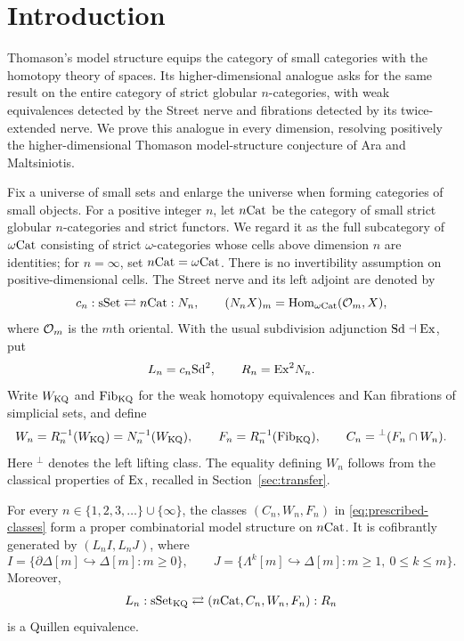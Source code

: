 \section{Introduction}
\label{sec:introduction}

Thomason's model structure equips the category of small categories with
the homotopy theory of spaces. Its higher-dimensional analogue asks for
the same result on the entire category of strict globular
$n$-categories, with weak equivalences detected by the Street nerve and
fibrations detected by its twice-extended nerve. We prove this analogue
in every dimension, resolving positively the higher-dimensional
Thomason model-structure conjecture of Ara and Maltsiniotis.

Fix a universe of small sets and enlarge the universe when forming
categories of small objects. For a positive integer $n$, let $n\mathrm{Cat}$ be
the category of small strict globular $n$-categories and strict functors.
We regard it as the full subcategory of $\omega\mathrm{Cat}$ consisting of strict
$\omega$-categories whose cells above dimension $n$ are identities; for
$n=\infty$, set $n\mathrm{Cat}=\omega\mathrm{Cat}$. There is no invertibility assumption on
positive-dimensional cells.
The Street nerve and its left adjoint are denoted by
\[
 c_n:\mathrm{sSet}\rightleftarrows n\mathrm{Cat}:N_n,
 \qquad (N_nX)_m=\operatorname{Hom}_{\omega\mathrm{Cat}}(\mathcal O_{m},X),
\]
where $\mathcal O_{m}$ is the $m$th oriental. With the usual subdivision
adjunction $\mathrm{Sd}\dashv\mathrm{Ex}$, put
\[
 L_n=c_n\mathrm{Sd}^2,\qquad R_n=\mathrm{Ex}^2N_n.
\]
Write $W_{\mathrm{KQ}}$ and $\mathrm{Fib}_{\mathrm{KQ}}$ for the weak homotopy
equivalences and Kan fibrations of simplicial sets, and define
\begin{equation}
\label{eq:prescribed-classes}
 W_n=R_n^{-1}(W_{\mathrm{KQ}})=N_n^{-1}(W_{\mathrm{KQ}}),\qquad
 F_n=R_n^{-1}(\mathrm{Fib}_{\mathrm{KQ}}),\qquad
 C_n={}^{\perp}(F_n\cap W_n).
\end{equation}
Here ${}^{\perp}$ denotes the left lifting class. The equality defining
$W_n$ follows from the classical properties of $\mathrm{Ex}$, recalled in
Section~\ref{sec:transfer}.

\begin{theorem}\label{thm:main}
For every $n\in\{1,2,3,\ldots\}\cup\{\infty\}$, the classes
$(C_n,W_n,F_n)$ in \eqref{eq:prescribed-classes} form a proper
combinatorial model structure on $n\mathrm{Cat}$. It is cofibrantly generated by
$(L_nI,L_nJ)$, where
\[
 I=\{\partial\Delta[m]\hookrightarrow\Delta[m]:m\ge0\},\qquad
 J=\{\Lambda^k[m]\hookrightarrow\Delta[m]:m\ge1,\ 0\le k\le m\}.
\]
Moreover,
\[
 L_n:\mathrm{sSet}_{\mathrm{KQ}}\rightleftarrows(n\mathrm{Cat},C_n,W_n,F_n):R_n
\]
is a Quillen equivalence.
\end{theorem}

